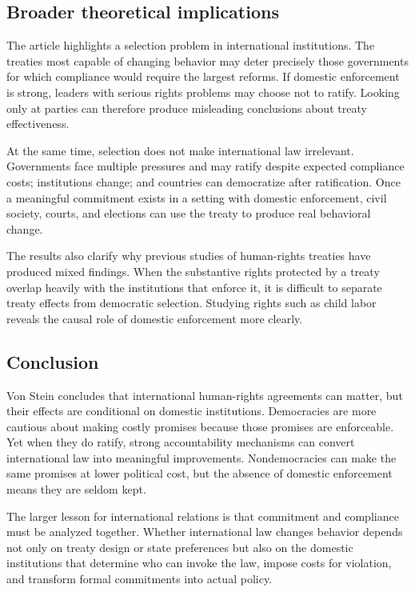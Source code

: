 \subsection{Broader theoretical implications}

The article highlights a selection problem in international institutions. The treaties most capable of changing behavior may deter precisely those governments for which compliance would require the largest reforms. If domestic enforcement is strong, leaders with serious rights problems may choose not to ratify. Looking only at parties can therefore produce misleading conclusions about treaty effectiveness.

At the same time, selection does not make international law irrelevant. Governments face multiple pressures and may ratify despite expected compliance costs; institutions change; and countries can democratize after ratification. Once a meaningful commitment exists in a setting with domestic enforcement, civil society, courts, and elections can use the treaty to produce real behavioral change.

The results also clarify why previous studies of human-rights treaties have produced mixed findings. When the substantive rights protected by a treaty overlap heavily with the institutions that enforce it, it is difficult to separate treaty effects from democratic selection. Studying rights such as child labor reveals the causal role of domestic enforcement more clearly.

\subsection{Conclusion}

Von Stein concludes that international human-rights agreements can matter, but their effects are conditional on domestic institutions. Democracies are more cautious about making costly promises because those promises are enforceable. Yet when they do ratify, strong accountability mechanisms can convert international law into meaningful improvements. Nondemocracies can make the same promises at lower political cost, but the absence of domestic enforcement means they are seldom kept.

The larger lesson for international relations is that commitment and compliance must be analyzed together. Whether international law changes behavior depends not only on treaty design or state preferences but also on the domestic institutions that determine who can invoke the law, impose costs for violation, and transform formal commitments into actual policy.
